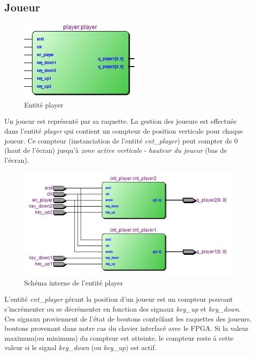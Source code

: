 \newpage
\subsection{Joueur}
\begin{figure}[h!]
	\centering
	\includegraphics[scale=1.0]{images/player.jpg}
	\caption{Entité player}
	\label{fig:player}
\end{figure}

Un joueur est représenté par sa raquette. La gestion des joueurs est effectuée dans l'entité \emph{player} qui contient un compteur de position verticale pour chaque joueur. Ce compteur (instanciation de l'entité \emph{cnt\_player}) peut compter de 0 (haut de l'écran) jusqu'à \emph{zone active verticale} - \emph{hauteur du joueur} (bas de l'écran).\\

\begin{figure}[h!]
	\centering
	\includegraphics[scale=1.0]{images/player_player.jpg}
	\caption{Schéma interne de l'entité player}
	\label{fig:playerplayer}
\end{figure}

L'entité \emph{cnt\_player} gérant la position d'un joueur est un compteur pouvant s'incrémenter ou se décrémenter en fonction des signaux \emph{key\_up} et \emph{key\_down}. Ces signaux proviennent de l'état de boutons contrôlant les raquettes des joueurs, boutons provenant dans notre cas du clavier interfacé avec le FPGA. Si la valeur maximum(ou minimum) du compteur est atteinte, le compteur reste à cette valeur si le signal \emph{key\_down} (ou \emph{key\_up}) est actif.\\

